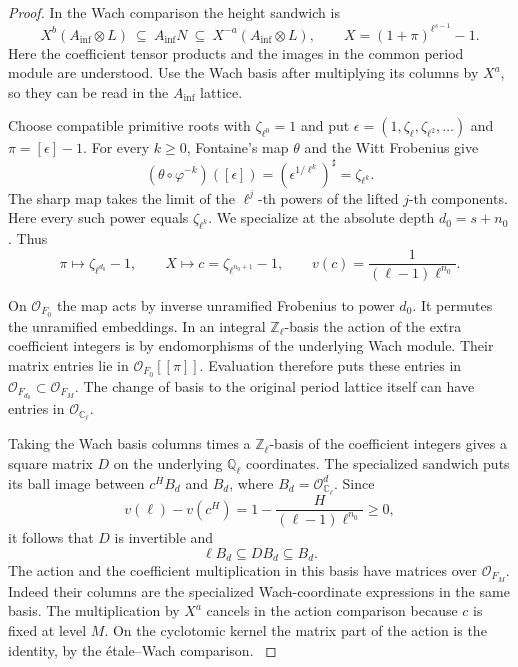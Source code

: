 \begin{proof}
In the Wach comparison the height sandwich is
\[
 X^b (A_{\inf}\otimes L)\ \subseteq\ A_{\inf}N
    \ \subseteq\ X^{-a}(A_{\inf}\otimes L),
 \qquad X=(1+\pi)^{\ell^{s-1}}-1.
\]
Here the coefficient tensor products and the images
in the common period module are understood.
Use the Wach basis after multiplying its columns
by \(X^a\), so they can be read in the \(A_{\inf}\)
lattice.

Choose compatible primitive roots with \(\zeta_{\ell^0}=1\)
and put \(\epsilon=(1,\zeta_\ell,\zeta_{\ell^2},\ldots)\) and
\(\pi=[\epsilon]-1\). For every \(k\ge0\), Fontaine's map
\(\theta\) and the Witt Frobenius give
\[
  (\theta\circ\varphi^{-k})([\epsilon])
       =(\epsilon^{1/\ell^k})^\sharp=\zeta_{\ell^k}.
\]
The sharp map takes the limit of the \(\ell^j\)-th powers of
the lifted \(j\)-th components. Here every such power equals
\(\zeta_{\ell^k}\). We specialize at the absolute depth
\(d_0=s+n_0\). Thus
\begin{equation}\label{eq:full-level-fontaine-map}
 \pi\longmapsto\zeta_{\ell^{d_0}}-1,\qquad
 X\longmapsto c=\zeta_{\ell^{n_0+1}}-1,\qquad
 v(c)=\frac{1}{(\ell-1)\ell^{n_0}} .
\end{equation}

On \(\mathcal O_{F_0}\) the map acts by inverse unramified
Frobenius to power \(d_0\). It permutes the unramified embeddings.
In an integral \(\mathbb Z_\ell\)-basis the action of the extra coefficient
integers is by endomorphisms of the underlying Wach module.
Their matrix entries lie in \(\mathcal O_{F_0}[[\pi]]\).
Evaluation therefore puts these entries in
\(\mathcal O_{F_{d_0}}\subset\mathcal O_{F_M}\).
The change of basis to the original period lattice itself can
have entries in \(\mathcal O_{\mathbb C_\ell}\).

Taking the Wach basis columns times a
\(\mathbb Z_\ell\)-basis of the coefficient integers gives
a square matrix \(D\) on the underlying \(\mathbb Q_\ell\)
coordinates. The specialized sandwich puts its ball
image between \(c^H B_d\) and \(B_d\), where
\(B_d=\mathcal O_{\mathbb C_\ell}^d\).
Since
\[
 v(\ell)-v(c^H)=1-\frac{H}{(\ell-1)\ell^{n_0}}\ge0,
\]
it follows that \(D\) is invertible and
\[
                       \ell B_d\subseteq DB_d\subseteq B_d.
\]
The action and the coefficient multiplication in this
basis have matrices over \(\mathcal O_{F_M}\).
Indeed their columns are the specialized
Wach-coordinate expressions in the same basis.
The multiplication by \(X^a\) cancels in the action
comparison because \(c\) is fixed at level \(M\).
On the cyclotomic kernel the matrix part of the
action is the identity, by the \'etale--Wach
comparison. \label{cor:ramified-cyclotomic-2}


\end{proof}
